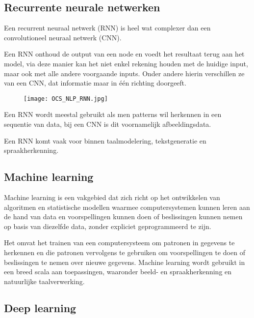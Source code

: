 \cite{li2021survey}

\subsection{Recurrente neurale netwerken}

Een recurrent neuraal netwerk (RNN) is heel wat complexer dan een convolutioneel neuraal netwerk (CNN). 

Een RNN onthoud de output van een node en voedt het resultaat terug aan het model, via deze manier kan het niet enkel rekening houden met de huidige input, maar ook met alle andere voorgaande inputs. Onder andere hierin verschillen ze van een CNN, dat informatie maar in één richting doorgeeft.

\begin{figure}[htbp]
    \centering
    \texttt{[image: OCS\_NLP\_RNN.jpg]}
    \caption{\cite{Kerdijk2020}}
    \label{fig:recurrent_diagram}
\end{figure}

Een RNN wordt meestal gebruikt als men patterns wil herkennen in een sequentie van data, bij een CNN is dit voornamelijk afbeeldingsdata.

Een RNN komt vaak voor binnen taalmodelering, tekstgeneratie en spraakherkenning.

\cite{schmidt2019recurrent}

\subsection{Machine learning}

Machine learning is een vakgebied dat zich richt op het ontwikkelen van algoritmen en statistische modellen waarmee computersystemen kunnen leren aan de hand van data en voorspellingen kunnen doen of beslissingen kunnen nemen op basis van diezelfde data, zonder expliciet geprogrammeerd te zijn. 

Het omvat het trainen van een computersysteem om patronen in gegevens te herkennen en die patronen vervolgens te gebruiken om voorspellingen te doen of beslissingen te nemen over nieuwe gegevens. Machine learning wordt gebruikt in een breed scala aan toepassingen, waaronder beeld- en spraakherkenning en natuurlijke taalverwerking.

\cite{biamonte2017quantum}

\subsection{Deep learning}

